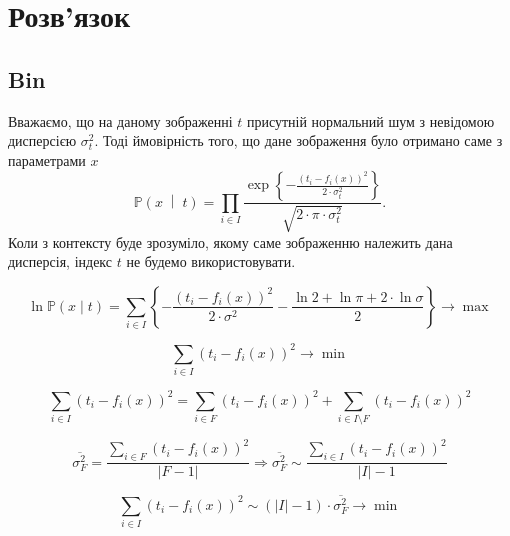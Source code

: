 \section{Розв'язок}

\subsection{Bin}

Вважаємо, що на даному зображенні $t$
присутній нормальний шум з невідомою дисперсією $\sigma^2_t$.
Тоді ймовірність того,
що дане зображення було отримано саме з параметрами $x$
\begin{equation*}
  \mathbb{P}\left( x \;\middle|\; t \right)
  = \prod_{i \in I}
    \frac{\exp{\left\{- \frac{\left( t_i - f_i\left( x \right) \right)^2}
           {2 \cdot \sigma^2_t} \right\}}}
           {\sqrt{2 \cdot \pi \cdot \sigma^2_t}}.
\end{equation*}
Коли з контексту буде зрозуміло,
якому саме зображенню належить дана дисперсія,
індекс $t$ не будемо використовувати.

\begin{equation*}
  \ln{\mathbb{P}\left( x \mid t \right)}
  = \sum_{i \in I}
    \left\{
      - \frac{\left( t_i - f_i\left( x \right) \right)^2}{2 \cdot \sigma^2}
      - \frac{\ln{2} + \ln{\pi} + 2 \cdot \ln{\sigma}}{2}
    \right\}
  \to \max
\end{equation*}

\begin{equation*}
  \sum_{i \in I} \left( t_i - f_i\left( x \right) \right)^2 \to \min
\end{equation*}

\begin{equation*}
  \sum_{i \in I} \left( t_i - f_i\left( x \right) \right)^2
  = \sum_{i \in F} \left( t_i - f_i\left( x \right) \right)^2
  + \sum_{i \in I \setminus F} \left( t_i - f_i\left( x \right) \right)^2
\end{equation*}

\begin{equation*}
    \overline{\sigma_F^2}
    = \frac{\sum\limits_{i \in F} \left( t_i - f_i\left( x \right) \right)^2}
           {\left| F - 1 \right|}
    \Rightarrow
    \overline{\sigma_F^2}
    \sim \frac{\sum\limits_{i \in I}
                 \left( t_i - f_i\left( x \right) \right)^2}
               {\left| I \right| - 1}
\end{equation*}

\begin{equation*}
  \sum_{i \in I} \left( t_i - f_i\left( x \right) \right)^2
  \sim \left( \left| I \right| - 1 \right) \cdot \overline{\sigma_F^2}
  \to \min
\end{equation*}

